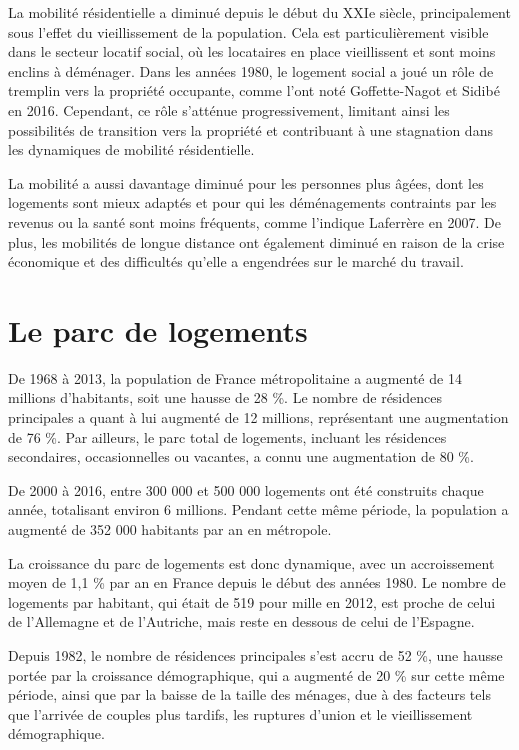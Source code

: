 \documentclass[a4paper, 12pt]{report}
\begin{document}
La mobilité résidentielle a diminué depuis le début du XXIe siècle, principalement sous l’effet du vieillissement de la population. Cela est particulièrement visible dans le secteur locatif social, où les locataires en place vieillissent et sont moins enclins à déménager. Dans les années 1980, le logement social a joué un rôle de tremplin vers la propriété occupante, comme l'ont noté Goffette-Nagot et Sidibé en 2016. Cependant, ce rôle s’atténue progressivement, limitant ainsi les possibilités de transition vers la propriété et contribuant à une stagnation dans les dynamiques de mobilité résidentielle.

La mobilité a aussi davantage diminué pour les personnes plus âgées, dont les logements sont mieux adaptés et pour qui les déménagements contraints par les revenus ou la santé sont moins fréquents, comme l'indique Laferrère en 2007. De plus, les mobilités de longue distance ont également diminué en raison de la crise économique et des difficultés qu’elle a engendrées sur le marché du travail.

\section{Le parc de logements}

De 1968 à 2013, la population de France métropolitaine a augmenté de 14 millions d’habitants, soit une hausse de 28 \%. Le nombre de résidences principales a quant à lui augmenté de 12 millions, représentant une augmentation de 76 \%. Par ailleurs, le parc total de logements, incluant les résidences secondaires, occasionnelles ou vacantes, a connu une augmentation de 80 \%.

De 2000 à 2016, entre 300 000 et 500 000 logements ont été construits chaque année, totalisant environ 6 millions. Pendant cette même période, la population a augmenté de 352 000 habitants par an en métropole.

La croissance du parc de logements est donc dynamique, avec un accroissement moyen de 1,1 \% par an en France depuis le début des années 1980. Le nombre de logements par habitant, qui était de 519 pour mille en 2012, est proche de celui de l’Allemagne et de l’Autriche, mais reste en dessous de celui de l’Espagne.

Depuis 1982, le nombre de résidences principales s’est accru de 52 \%, une hausse portée par la croissance démographique, qui a augmenté de 20 \% sur cette même période, ainsi que par la baisse de la taille des ménages, due à des facteurs tels que l'arrivée de couples plus tardifs, les ruptures d’union et le vieillissement démographique.
\end{document}
